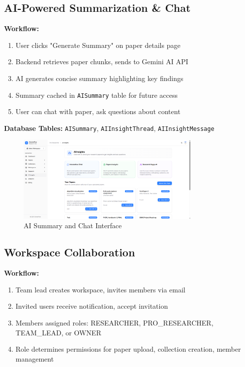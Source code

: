 \subsection{AI-Powered Summarization \& Chat}

\textbf{Workflow:}
\begin{enumerate}[leftmargin=*,topsep=3pt,itemsep=2pt]
    \item User clicks "Generate Summary" on paper details page
    \item Backend retrieves paper chunks, sends to Gemini AI API
    \item AI generates concise summary highlighting key findings
    \item Summary cached in \texttt{AISummary} table for future access
    \item User can chat with paper, ask questions about content
\end{enumerate}

\textbf{Database Tables:} \texttt{AISummary}, \texttt{AIInsightThread}, \texttt{AIInsightMessage}

\begin{figure}[H]
\centering
\includegraphics[width=0.8\textwidth]{images/screenshots/ai_insights.png}
\caption{AI Summary and Chat Interface}
\label{fig:ai}
\end{figure}

\subsection{Workspace Collaboration}

\textbf{Workflow:}
\begin{enumerate}[leftmargin=*,topsep=3pt,itemsep=2pt]
    \item Team lead creates workspace, invites members via email
    \item Invited users receive notification, accept invitation
    \item Members assigned roles: RESEARCHER, PRO\_RESEARCHER, TEAM\_LEAD, or OWNER
    \item Role determines permissions for paper upload, collection creation, member management
\end{enumerate}

